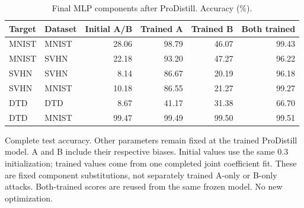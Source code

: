 \begin{table}[t]
\centering\small
\setlength{\tabcolsep}{4pt}
\caption{Final MLP components after ProDistill. Accuracy (\%).}
\label{tab:prodistill_components}
\begin{tabular}{@{}llrrrr@{}}
\toprule
Target & Dataset & Initial A/B & Trained A & Trained B & Both trained \\
\midrule
MNIST & MNIST & 28.06 & 98.79 & 46.07 & 99.43 \\
MNIST & SVHN & 22.18 & 93.20 & 47.27 & 96.22 \\
\midrule
SVHN & SVHN & 8.14 & 86.67 & 20.19 & 96.18 \\
SVHN & MNIST & 10.18 & 86.55 & 21.27 & 99.27 \\
\midrule
DTD & DTD & 8.67 & 41.17 & 31.38 & 66.70 \\
DTD & MNIST & 99.47 & 99.49 & 99.50 & 99.51 \\
\bottomrule
\end{tabular}
\par\smallskip
\begin{minipage}{\textwidth}\footnotesize Complete test accuracy. Other parameters remain fixed at the trained ProDistill model. A and B include their respective biases. Initial values use the same 0.3 initialization; trained values come from one completed joint coefficient fit. These are fixed component substitutions, not separately trained A-only or B-only attacks. Both-trained scores are reused from the same frozen model. No new optimization.\end{minipage}
\end{table}

